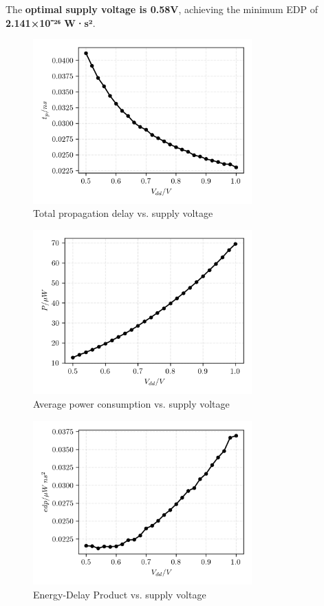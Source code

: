 \documentclass[UTF8,12pt,a4paper]{ctexart}
\begin{document}
The \textbf{optimal supply voltage is 0.58V}, achieving the minimum EDP of \textbf{2.141×10⁻²⁶ W·s²}.

\begin{figure}[h]
\centering
\includegraphics[width=0.75\textwidth]{Task4/tp_total_vs_volts.png}
\caption{Total propagation delay vs. supply voltage}
\label{fig:task4_delay}
\end{figure}

\begin{figure}[h]
\centering
\includegraphics[width=0.75\textwidth]{Task4/power_vs_volts.png}
\caption{Average power consumption vs. supply voltage}
\label{fig:task4_power}
\end{figure}

\begin{figure}[h]
\centering
\includegraphics[width=0.75\textwidth]{Task4/edp_vs_volts.png}
\caption{Energy-Delay Product vs. supply voltage}
\label{fig:task4_edp}
\end{figure}
\end{document}
